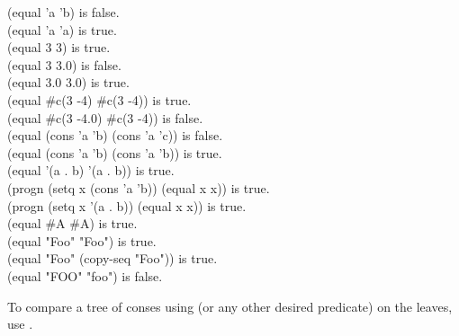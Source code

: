 \begin{defun}[Function]
\begin{lisp}
(equal 'a 'b) \textrm{is false.} \\
(equal 'a 'a) \textrm{is true.} \\
(equal 3 3) \textrm{is true.} \\
(equal 3 3.0) \textrm{is false.} \\
(equal 3.0 3.0) \textrm{is true.} \\
(equal \#c(3 -4) \#c(3 -4)) \textrm{is true.} \\
(equal \#c(3 -4.0) \#c(3 -4)) \textrm{is false.} \\
(equal (cons 'a 'b) (cons 'a 'c)) \textrm{is false.} \\
(equal (cons 'a 'b) (cons 'a 'b)) \textrm{is true.} \\
(equal '(a . b) '(a . b)) \textrm{is true.} \\
(progn (setq x (cons 'a 'b)) (equal x x)) \textrm{is true.} \\
(progn (setq x '(a . b)) (equal x x)) \textrm{is true.} \\
(equal \#{\Xbackslash}A \#{\Xbackslash}A) \textrm{is true.} \\
(equal "Foo" "Foo") \textrm{is true.} \\
(equal "Foo" (copy-seq "Foo")) \textrm{is true.} \\
(equal "FOO" "foo") \textrm{is false.}
\end{lisp}
To compare a tree of conses using 
(or any other desired predicate) on the leaves, use .

\end{defun}


